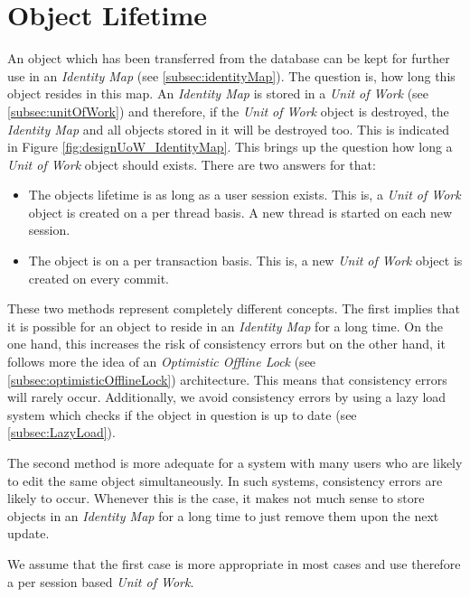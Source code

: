 	\section{Object Lifetime}
	\label{sec:objectLifetime}
		An object which has been transferred from the database can be kept for further use in
		an \textit{Identity Map} (see \ref{subsec:identityMap}). The question is, how long this object resides in this
		map. An \textit{Identity Map} is stored in a \textit{Unit of Work} (see \ref{subsec:unitOfWork}) and therefore, if the
		\textit{Unit of Work} object is destroyed, the \textit{Identity Map} and all objects
		stored in it will be destroyed too. This is indicated in Figure \ref{fig:designUoW_IdentityMap}.
		This brings up the question how long a \textit{Unit of Work} object should exists. There are
		two answers for that:
		\begin{itemize}
			\item The objects lifetime is as long as a user session exists. This is, a \textit{Unit of Work}
						object is created on a per thread basis. A new thread is started on each new session.
			\item The object is on a per transaction basis. This is, a new \textit{Unit of Work} object is 
						created on every commit.
		\end{itemize}
		These two methods represent completely different concepts. The first implies that it is possible 
		for an object to reside in an \textit{Identity Map} for a long time. On the one hand, this increases the
		risk of consistency errors but on the other hand, it follows more the idea of an \textit{Optimistic
		Offline Lock} (see \ref{subsec:optimisticOfflineLock}) architecture. This means that
		consistency errors will rarely occur.
		Additionally, we avoid consistency errors by using a lazy load
		system which checks if the object in question is up to date (see \ref{subsec:LazyLoad}).
		
		The second method is more adequate for a system with many users who are likely to
		edit the same object simultaneously. In such
		systems, consistency errors are likely to occur. Whenever this is the case, it makes not
		much sense to store objects in an \textit{Identity Map} for a long time to just remove
		them upon the next update.
		
		We assume that the first case is more appropriate in most cases and use therefore a per
		session based \textit{Unit of Work}.
		
